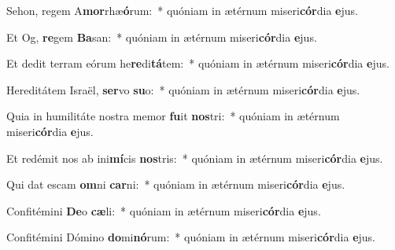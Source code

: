 \item Sehon, regem A\textbf{mor}rhæ\textbf{ó}rum:~* quóniam in ætérnum miseri\textbf{cór}dia \textbf{e}jus.
\item Et Og, \textbf{re}gem \textbf{Ba}san:~* quóniam in ætérnum miseri\textbf{cór}dia \textbf{e}jus.
\item Et dedit terram eórum he\textbf{re}di\textbf{tá}tem:~* quóniam in ætérnum miseri\textbf{cór}dia \textbf{e}jus.
\item Hereditátem Israël, \textbf{ser}vo \textbf{su}o:~* quóniam in ætérnum miseri\textbf{cór}dia \textbf{e}jus.
\item Quia in humilitáte nostra memor \textbf{fu}it \textbf{nos}tri:~* quóniam in ætérnum miseri\textbf{cór}dia \textbf{e}jus.
\item Et redémit nos ab ini\textbf{mí}cis \textbf{nos}tris:~* quóniam in ætérnum miseri\textbf{cór}dia \textbf{e}jus.
\item Qui dat escam \textbf{om}ni \textbf{car}ni:~* quóniam in ætérnum miseri\textbf{cór}dia \textbf{e}jus.
\item Confitémini \textbf{De}o \textbf{cæ}li:~* quóniam in ætérnum miseri\textbf{cór}dia \textbf{e}jus.
\item Confitémini Dómino \textbf{do}mi\textbf{nó}rum:~* quóniam in ætérnum miseri\textbf{cór}dia \textbf{e}jus.
